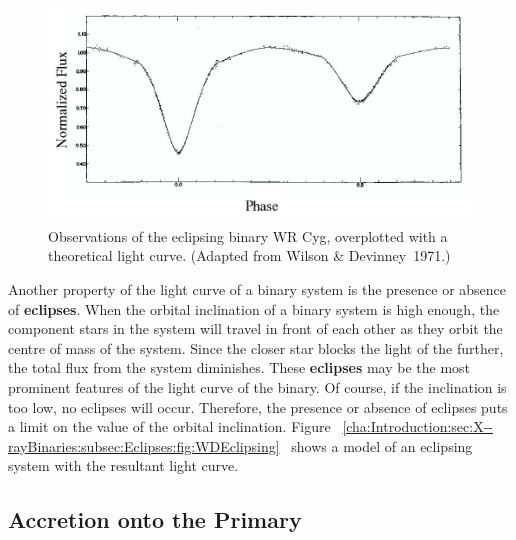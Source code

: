 \begin{figure}[!htb]
\begin{center}
\includegraphics[width=15.0cm]{WDEclipsing}
\caption{%
Observations of the eclipsing binary WR Cyg, overplotted with a theoretical light curve. %
(Adapted from Wilson \& Devinney~1971.)%
}\label{cha:Introduction:sec:X--rayBinaries:subsec:Eclipses:fig:WDEclipsing}
\end{center}
\end{figure}
\nocite{WilsonDevinney:1971} %



Another property of the light curve of a binary system is the presence
or absence of \textbf{eclipses}. When the orbital inclination of a binary system is high enough, the component stars in the system will travel in front of each other as they orbit the centre
of mass of the system. Since the closer star blocks the light of the
further, the total flux from the system diminishes. These \textbf{eclipses} may be the most prominent features of the light curve of the
binary. Of course, if the inclination is too low, no eclipses will
occur. Therefore, the presence or absence of eclipses puts a limit on
the value of the orbital inclination. Figure~%
\vref{cha:Introduction:sec:X--rayBinaries:subsec:Eclipses:fig:WDEclipsing}%
\ shows a model of an eclipsing system with the resultant light
curve. %


\subsection{Accretion onto the Primary}\label{cha:Introduction:sec:BinaryStarSystems:subsec:Accretion}

